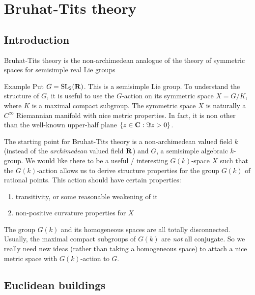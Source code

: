 




\section{Bruhat-Tits theory}





\subsection{Introduction}

Bruhat-Tits theory is the non-archimedean analogue of the theory of symmetric 
spaces for semisimple real Lie groups 

\begin{enonce}{Example}
Put $G=\operatorname{SL}_2(\mathbf{R})$. This is a semisimple Lie group. To understand the 
structure of $G$, it is useful to use the $G$-action on its symmetric space 
$X=G/K$, where $K$ is a maximal compact subgroup. The symmetric space $X$ is 
naturally a $C^\infty$ Riemannian manifold with nice metric properties. In 
fact, it is non other than the well-known upper-half plane 
$\{z\in \mathbf{C}:\Im z>0\}$. 
\end{enonce}

The starting point for Bruhat-Tits theory is a non-archimedean valued field $k$ 
(instead of the \emph{archimedean} valued field $\mathbf{R}$) and $G$, a semisimple 
algebraic $k$-group. We would like there to be a useful / interesting 
$G(k)$-space $X$ such that the $G(k)$-action allows us to derive structure 
properties for the group $G(k)$ of rational points. This action should have 
certain properties:
\begin{enumerate}
  \item transitivity, or some reasonable weakening of it 
  \item non-positive curvature properties for $X$
\end{enumerate}

The group $G(k)$ and its homogeneous spaces are all totally disconnected. 
Usually, the maximal compact subgroups of $G(k)$ are \emph{not} all conjugate. 
So we really need new ideas (rather than taking a homogeneous space) to attach 
a nice metric space with $G(k)$-action to $G$. 





\subsection{Euclidean buildings}


